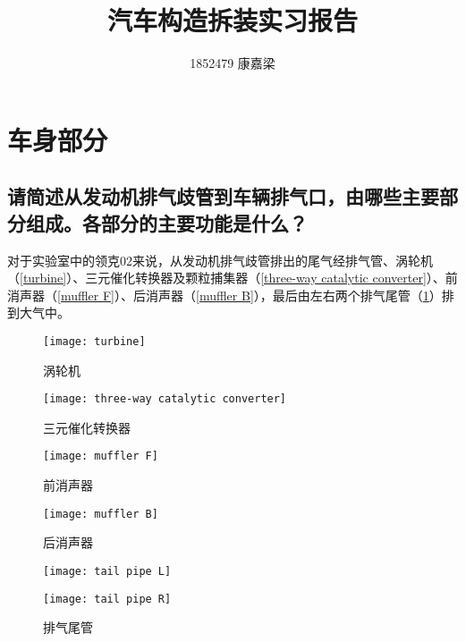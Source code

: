 \documentclass[UTF8]{ctexart}
\title{汽车构造拆装实习报告}
\author{1852479 康嘉梁}
\date{}
\numberwithin{figure}{section}
\numberwithin{table}{section}
\begin{document}
\maketitle
\tableofcontents

\clearpage

\section{车身部分}
\subsection{请简述从发动机排气歧管到车辆排气口，由哪些主要部分组成。各部分的主要功能是什么？}

\label{subsection:1.1}

对于实验室中的领克02来说，从发动机排气歧管排出的尾气经排气管、涡轮机（\cref{turbine}）、三元催化转换器及颗粒捕集器（\cref{three-way catalytic converter}）、前消声器（\cref{muffler F}）、后消声器（\cref{muffler B}），最后由左右两个排气尾管（\cref{tail pipe}）排到大气中。

\begin{figure}[htbp]
	\centering
	\begin{minipage}[b]{0.3\textwidth}
		\centering
		\texttt{[image: turbine]}
		\caption{涡轮机}
		\label{turbine}
	\end{minipage}
	\begin{minipage}[b]{0.4\textwidth}
		\centering
		\texttt{[image: three-way catalytic converter]}
		\caption{三元催化转换器}
		\label{three-way catalytic converter}
	\end{minipage}
	\begin{minipage}[b]{0.25\textwidth}
		\centering
		\texttt{[image: muffler F]}
		\caption{前消声器}
		\label{muffler F}
	\end{minipage}
	\begin{minipage}[b]{0.55\textwidth}
		\centering
		\texttt{[image: muffler B]}
		\caption{后消声器}
		\label{muffler B}
	\end{minipage}
	\begin{minipage}[b]{0.4\textwidth}
		\centering
		\begin{minipage}[b]{0.45\textwidth}
			\centering
			\texttt{[image: tail pipe L]}
		\end{minipage}
		\begin{minipage}[b]{0.45\textwidth}
			\centering
			\texttt{[image: tail pipe R]}
		\end{minipage}
		\caption{排气尾管}
		\label{tail pipe}
	\end{minipage}
\end{figure}
\end{document}
